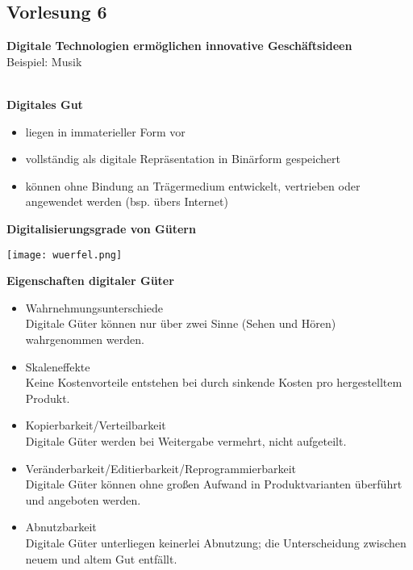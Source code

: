 \documentclass[a4]{scrartcl}
\begin{document}
\subsection*{Vorlesung 6}

\textbf{Digitale Technologien ermöglichen innovative Geschäftsideen} \\
Beispiel: Musik
\\ \\

\vspace*{2em}

\textbf{Digitales Gut} 
\begin{itemize}
\item liegen in immaterieller Form vor
\item vollständig als digitale Repräsentation in Binärform gespeichert
\item können ohne Bindung an Trägermedium entwickelt, vertrieben oder angewendet werden (bsp. übers Internet)
\end{itemize}

\textbf{Digitalisierungsgrade von Gütern}

\texttt{[image: wuerfel.png]}

\vspace*{1em}

\textbf{Eigenschaften digitaler Güter} 

\begin{itemize}
\item Wahrnehmungsunterschiede \\
Digitale Güter können nur über zwei Sinne (Sehen und Hören) wahrgenommen werden.
\item Skaleneffekte \\
Keine Kostenvorteile entstehen bei durch sinkende Kosten pro hergestelltem Produkt.
\item Kopierbarkeit/Verteilbarkeit \\
Digitale Güter werden bei Weitergabe vermehrt, nicht aufgeteilt.
\item Veränderbarkeit/Editierbarkeit/Reprogrammierbarkeit \\
Digitale Güter können ohne großen Aufwand in Produktvarianten überführt und angeboten werden.
\item Abnutzbarkeit \\
Digitale Güter unterliegen keinerlei Abnutzung; die Unterscheidung zwischen neuem und altem Gut entfällt.
\end{itemize}
\end{document}
